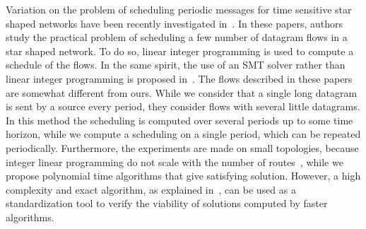 \documentclass[a4paper,10pt]{journal}
\begin{document}

Variation on the problem of scheduling periodic messages for time sensitive star shaped networks have been recently investigated in~\cite{9472838,nayak2017incremental,steiner2018traffic,silviu2017,naresh2016}. In these papers, authors study the practical problem of scheduling a few number of datagram flows in a star shaped network. To do so, linear integer programming is used to compute a schedule of the flows. In the same spirit, the use of an SMT solver rather than linear integer programming is proposed in~\cite{dos2019tsnsched}. The flows described in these papers are somewhat different from ours. While we consider that a single long datagram is sent by a source every period, they consider flows with several little datagrams. In this method the scheduling is computed over several periods up to some time horizon, while we compute a scheduling on a single period, which can be repeated periodically. Furthermore, the experiments are made on small topologies, because integer linear programming do not scale with the number of routes~\cite{masoudi2020cost}, while we propose polynomial time algorithms that give satisfying solution. However, a high complexity and exact algorithm, as explained in~\cite{steiner2018traffic}, can be used as a standardization tool to verify the viability of solutions computed by faster algorithms. 

\end{document}
